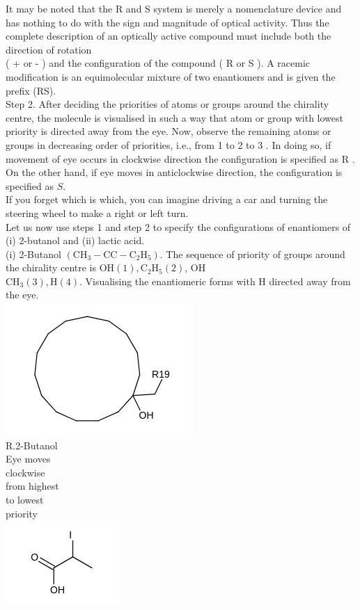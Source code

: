 \documentclass[10pt]{article}
\begin{document}
It may be noted that the R and S system is merely a nomenclature device and has nothing to do with the sign and magnitude of optical activity. Thus the complete description of an optically active compound must include both the direction of rotation\\
( + or - ) and the configuration of the compound ( R or S ). A racemic modification is an equimolecular mixture of two enantiomers and is given the prefix (RS).\\
Step 2. After deciding the priorities of atoms or groups around the chirality centre, the molecule is visualised in such a way that atom or group with lowest priority is directed away from the eye. Now, observe the remaining atoms or groups in decreasing order of priorities, i.e., from 1 to 2 to 3 . In doing so, if movement of eye occurs in clockwise direction the configuration is specified as R . On the other hand, if eye moves in anticlockwise direction, the configuration is specified as $S$.\\
If you forget which is which, you can imagine driving a car and turning the steering wheel to make a right or left turn.\\
Let us now use steps 1 and step 2 to specify the configurations of enantiomers of (i) 2-butanol and (ii) lactic acid.\\
(i) 2-Butanol $\left(\mathrm{CH}_{3}-\mathrm{C} \mathrm{C}-\mathrm{C}_{2} \mathrm{H}_{5}\right)$. The sequence of priority of groups around the chirality centre is $\mathrm{OH}(1), \mathrm{C}_{2} \mathrm{H}_{5}(2)$, OH\\
$\mathrm{CH}_{3}(3), \mathrm{H}(4)$. Visualising the enantiomeric forms with H directed away from the eye.\\
\includegraphics{smile-618bd589f41a301624e8605142967453c90a0a1e}\\
R.2-Butanol\\
Eye moves\\
clockwise\\
from highest\\
to lowest\\
priority\\
\includegraphics{smile-ad3894f388ff9c9c3359149f3f8b4d6681854c6a}
\end{document}

